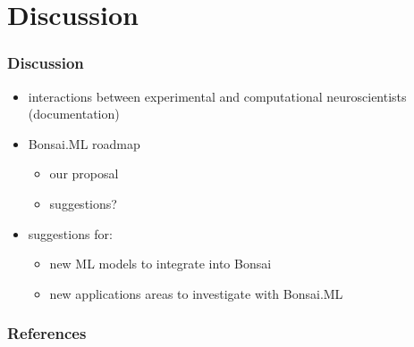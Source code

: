 \documentclass{beamer}
\begin{document}
\section{Discussion}

\begin{frame}
    \frametitle{Discussion}

    \begin{itemize}
        \item interactions between experimental and computational
            neuroscientists (documentation)

        \item Bonsai.ML roadmap

            \begin{itemize}

                \item our proposal
                \item suggestions?

            \end{itemize}

        \item suggestions for:

            \begin{itemize}
                \item new ML models to integrate into Bonsai
                \item new applications areas to investigate with Bonsai.ML
            \end{itemize}

    \end{itemize}

\end{frame}

\begin{frame}
    \frametitle{References}

    \tiny{
        
        
    }
\end{frame}
\end{document}

